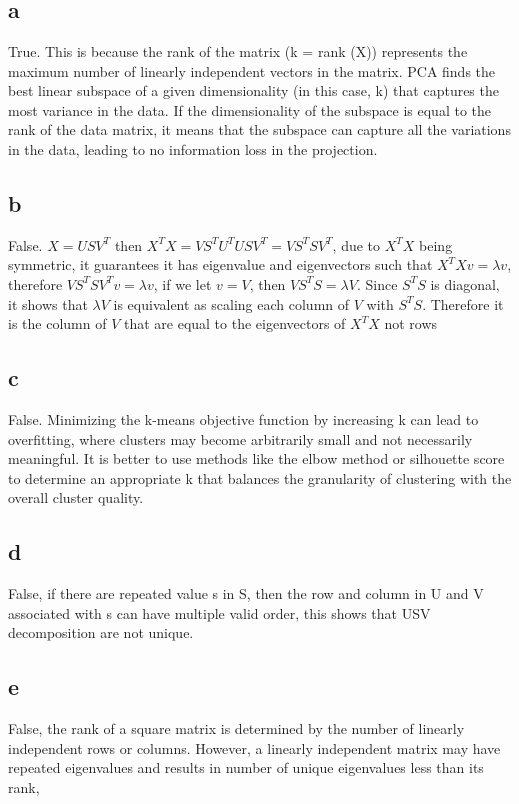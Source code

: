 \section{}

\subsection{a}
True. This is because the rank of the matrix (k = rank (X)) represents the maximum number of linearly independent vectors 
in the matrix. PCA finds the best linear subspace of a given dimensionality (in this case, k) that captures the most 
variance in the data. If the dimensionality of the subspace is equal to the rank of the data matrix, it means that 
the subspace can capture all the variations in the data, leading to no information loss in the projection.

\subsection{b}
False. $X = USV^T$ then $X^{T}X = VS^{T}U^{T}USV^{T} = VS^{T}SV^{T}$, due to $X^{T}X$ being symmetric, it guarantees it has eigenvalue 
and eigenvectors such that $X^{T}X v = \lambda v$, therefore $VS^{T}SV^T v = \lambda v$, if we let $v = V$, then $VS^{T}S = \lambda V$.
Since $S^{T}S$ is diagonal, it shows that $\lambda V$ is equivalent as scaling each column of $V$ with $S^{T}S$. Therefore it is the 
column of $V$ that are equal to the eigenvectors of $X^{T}X$ not rows

\subsection{c}
False. Minimizing the k-means objective function by increasing 
k can lead to overfitting, where clusters may become arbitrarily small and not necessarily meaningful.
It is better to use methods like the elbow method or silhouette score to determine an appropriate 
k that balances the granularity of clustering with the overall cluster quality.

\subsection{d}
False, if there are repeated value s in S, then the row and column in U and V associated with s can have multiple 
valid order, this shows that USV decomposition are not unique. 

\subsection{e}
False, the rank of a square matrix is determined by the number of linearly independent rows or columns. However, a linearly independent
matrix may have repeated eigenvalues and results in number of unique eigenvalues less than its rank,